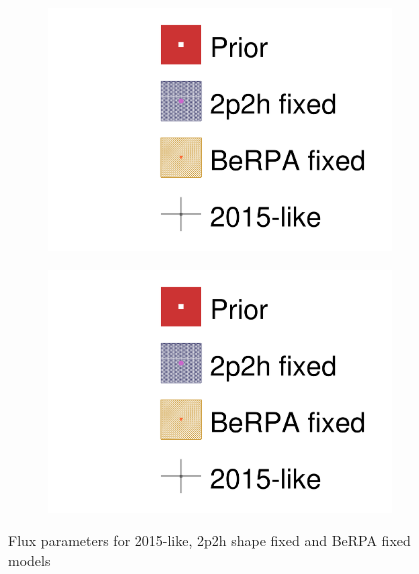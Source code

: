 \begin{figure}[h]
\begin{subfigure}[t]{0.24\textwidth}
		\includegraphics[width=\textwidth, trim={0mm 0mm 0mm 0mm}, clip,page=8]{figures/mach3/data/alt/2017b_NewData_NewDet_hpc_2p2hshapeFix_0_2017b_NewData_NewDet_hpc_BeRPAfix_0_2017b_NewData_NewDet_hpc_2015like_0.pdf}
	\end{subfigure}
	\begin{subfigure}[t]{0.24\textwidth}
		\includegraphics[width=\textwidth, trim={0mm 0mm 0mm 0mm}, clip,page=9]{figures/mach3/data/alt/2017b_NewData_NewDet_hpc_2p2hshapeFix_0_2017b_NewData_NewDet_hpc_BeRPAfix_0_2017b_NewData_NewDet_hpc_2015like_0.pdf}
	\end{subfigure}
	\caption{Flux parameters for 2015-like, 2p2h shape fixed and BeRPA fixed models}
	\label{fig:2015like_berpa_2p2h_comp_flux}
\end{figure}

